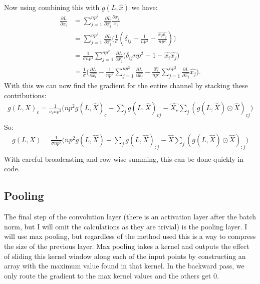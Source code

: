 \documentclass[12pt]{article}
\begin{document}
Now using combining this with $g(L, \hat{x})$ we have:
\begin{align*}
    \frac{\partial L}{\partial x_i} &= \sum_{j = 1}^{np^2} \frac{\partial L}{\partial \hat{x_j}} \frac{\partial \hat{x_j}}{x_i} \\
    &= \sum_{j = 1}^{np^2} \frac{\partial L}{\partial \hat{x_j}} \Big(\frac{1}{\sigma}(\delta_{ij} - \frac{1}{np^2} - \frac{\hat{x_i}\hat{x_j}}{np^2})\Big) \\
    &= \frac{1}{\sigma np^2} \sum_{j = 1}^{np^2} \frac{\partial L}{\partial \hat{x_j}} \Big(\delta_{ij}np^2 - 1 - \hat{x_i}\hat{x_j}) \\
    &= \frac{1}{\sigma}\Big(\frac{\partial L}{\partial \hat{x_i}}- \frac{1}{np^2}\sum_{j = 1}^{np^2} \frac{\partial L}{\partial \hat{x_j}} - \frac{\hat{x_i}}{np^2}\sum_{j = 1}^{np^2} \frac{\partial L}{\partial \hat{x_j}}\hat{x_j}\Big).
\end{align*}
With this we can now find the gradient for the entire channel by stacking
these contributions:
\begin{align*}
    g(L, X)_c = \frac{1}{\sigma_c np^2}\Big(np^2g(L, \hat{X})_c - \sum_{j}g(L, \hat{X})_{cj} - \hat{X_c}\sum_{j}(g(L, \hat{X}) \odot \hat{X})_{cj}\Big) \\
\end{align*}
So:
\begin{align*}
    g(L, X) = \frac{1}{\sigma np^2}\Big(np^2g(L, \hat{X}) - \sum_{j}g(L, \hat{X})_{:j} - \hat{X}\sum_{j}(g(L, \hat{X}) \odot \hat{X})_{:j}\Big) \\
\end{align*}
With careful broadcasting and row wise summing, this can be done quickly in code.

\subsection*{Pooling}
The final step of the convolution layer (there is an activation layer after the batch norm, but I will
omit the calculations as they are trivial) is the pooling layer. I will use max pooling,
but regardless of the method used this is a way to compress the size of the previous layer. Max pooling
takes a kernel and outputs the effect of sliding this kernel window along each of the input points
by constructing an array with the maximum value found in that kernel. In the backward pass, we only route
the gradient to the max kernel values and the others get 0.
\end{document}
